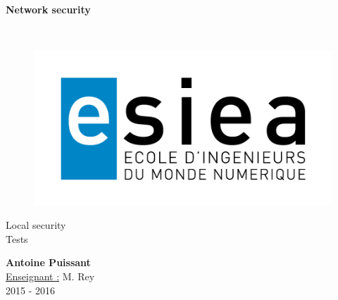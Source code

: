 \begin{titlepage}
      \begin{center}   
        \Huge
        \textbf{Network security}
        
        \LARGE
        ~
        
        
        \vfill
        \begin{figure}[H]
	    \centering
	    \begin{minipage}{0.9\textwidth}
		\centering
		\includegraphics[width=\textwidth]{./img/esiea.jpeg}
	    \end{minipage}\hfill
	\end{figure}
        \vfill
        
        \vspace{0.5cm}
        
        Local security\\Tests
        
        \vspace{2cm}
        \textbf{Antoine Puissant}\\
        \vspace{0.8cm}
        \Large
        \underline{Enseignant :} M. Rey\\
        \vspace{0.5cm}
        2015 - 2016%
        
    \end{center}
\end{titlepage}
